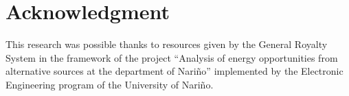 \documentclass[conference]{IEEEtran}
\begin{document}
  \section*{Acknowledgment}
\fi

This research was possible thanks to resources given by the General Royalty System in the framework of the project ``Analysis of energy opportunities from alternative sources at the department of Nariño'' implemented by the Electronic Engineering program of the University of Nariño.

\ifCLASSOPTIONcaptionsoff
  \newpage
\fi





\end{document}

